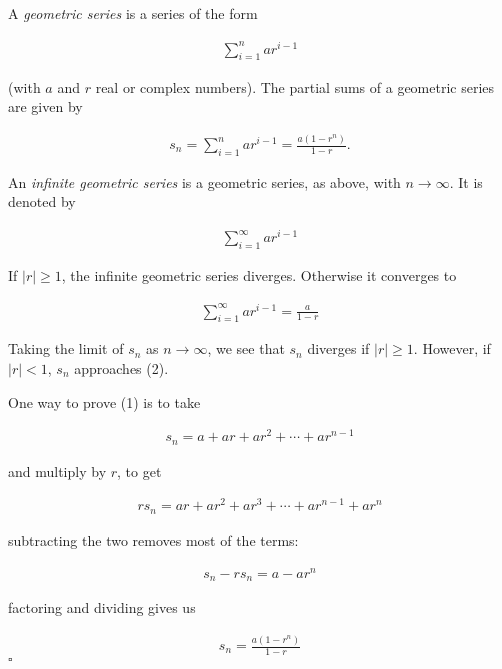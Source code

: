 \documentclass{article}
\begin{document}
A \emph{geometric series} is a series of the form

\begin{align*}
\sum_{i=1}^n ar^{i-1}
\end{align*}

(with $a$ and $r$ real or complex numbers).  The partial sums of a geometric series are given by

\begin{align}
s_n=\sum_{i=1}^n ar^{i-1} =  \frac{a(1 -r^n)}{1-r}.
\end{align}

An \emph{infinite geometric series} is a geometric series, as above, with $n \rightarrow \infty$.  It is denoted by

\begin{align*}
\sum_{i=1}^\infty ar^{i-1}
\end{align*}

If $|r|\ge 1$, the infinite geometric series diverges.  Otherwise it converges to

\begin{align}
\sum_{i=1}^\infty ar^{i-1}  =  \frac{a}{1-r}
\end{align}

Taking the limit of $s_n$ as  $n \rightarrow \infty$, we see that $s_n$ diverges if $|r| \ge 1$.  However, if $|r| < 1$, $s_n$ approaches (2).

One way to prove (1) is to take 

\begin{align*}
s_n  =  a + ar + ar^2 + \cdots + ar^{n-1}
\end{align*}

and multiply by $r$, to get

\begin{align*}
 r s_n  =  ar + ar^2 + ar^3 + \cdots + ar^{n-1} + ar^{n}
\end{align*}

subtracting the two removes most of the terms:

\begin{align*}
 s_n - rs_n  =  a - ar^n
\end{align*}

factoring and dividing gives us

\begin{align*}
s_n = \frac{a(1 -r^n)}{1-r}
\end{align*}
$\square$
\end{document}
